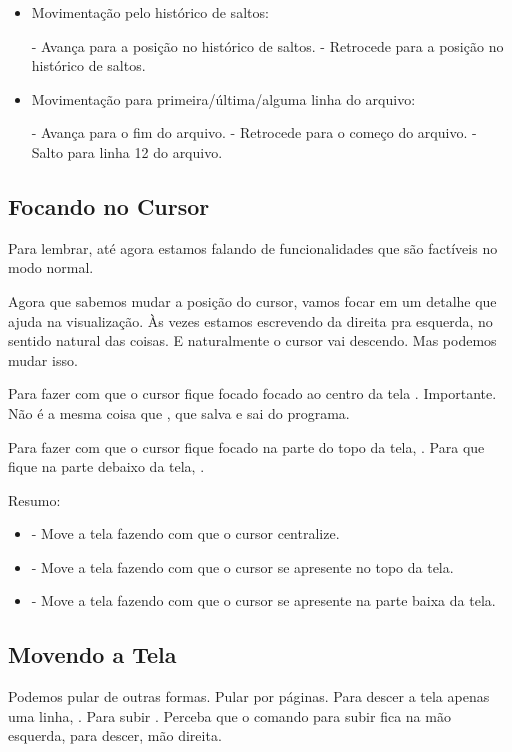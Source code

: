 \begin{itemize}
    \item Movimentação pelo histórico de saltos:

	\subitem {} - Avança para a posição no histórico de saltos.
	\subitem {} - Retrocede para a posição no histórico de saltos.

    \item Movimentação para primeira/última/alguma linha do arquivo:

	\subitem {} - Avança para o fim do arquivo.
	\subitem {} - Retrocede para o começo do arquivo.
	\subitem {} - Salto para linha 12 do arquivo.

\end{itemize}
    
\subsection{Focando no Cursor}
Para lembrar, até agora estamos falando de funcionalidades que são factíveis no modo normal.

Agora que sabemos mudar a posição do cursor, vamos focar em um detalhe que ajuda na visualização.
Às vezes estamos escrevendo da direita pra esquerda, no sentido natural das coisas.
E naturalmente o cursor vai descendo.
Mas podemos mudar isso.

Para fazer com que o cursor fique focado focado ao centro da tela .
Importante. Não é a mesma coisa que , que salva e sai do programa.

Para fazer com que o cursor fique focado na parte do topo da tela, .
Para que fique na parte debaixo da tela, .

Resumo:
\begin{itemize}
    \item {} - Move a tela fazendo com que o cursor centralize.
    \item {} - Move a tela fazendo com que o cursor se apresente no topo da tela.
    \item {} - Move a tela fazendo com que o cursor se apresente na parte baixa da tela.
\end{itemize}

\subsection{Movendo a Tela}
Podemos pular de outras formas. Pular por páginas.
Para descer a tela apenas uma linha, . Para subir .
Perceba que o comando para subir fica na mão esquerda, para descer, mão direita.

